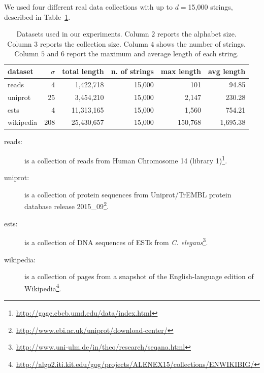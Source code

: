 \documentclass{elsarticle}
\begin{document}
We used four different real data collections with up to $d=$15,000 strings,
described in Table~\ref{t:data}.

\begin{savenotes}
\begin{table}[ht]
\centering
\caption{
Datasets used in our experiments. 
Column $2$ reports the alphabet size.
Column $3$ reports the collection size.
Column $4$ shows the number of strings.
Column $5$ and $6$ report the maximum and average length of each string.
}
\setlength{\tabcolsep}{4pt}
\renewcommand{\arraystretch}{1.2}
\label{t:data}
\begin{tabular}{lrrrrr}
\hline
dataset   & $\sigma$ & total length & n. of strings & max length & avg length  \\
\hline
{\sc reads}     & 4        & 1,422,718   & 15,000               & 101                     & 94.85    \\
{\sc uniprot}   & 25       & 3,454,210   & 15,000               & 2,147           & 230.28   \\
{\sc ests}      & 4        & 11,313,165  & 15,000       & 1,560           & 754.21   \\
{\sc wikipedia} & 208      & 25,430,657  & 15,000       & 150,768               & 1,695.38 \\
\hline
\end{tabular}

\begin{description}
\item[{\sc reads}:] is a collection of reads from Human Chromosome 14
  (library 1)\footnote{\url{http://gage.cbcb.umd.edu/data/index.html}}.

\item[{\sc uniprot}:] is a collection of protein sequences from
  Uniprot/TrEMBL protein database release
  2015\_09\footnote{\url{http://www.ebi.ac.uk/uniprot/download-center/}}.

\item[{\sc ests}:] is a collection of DNA sequences of ESTs from {\it
  C. elegans}\footnote{\url{http://www.uni-ulm.de/in/theo/research/seqana.html}}.

\item[{\sc wikipedia}:] is a collection of pages from a snapshot of the
  English-language edition of
  Wikipedia\footnote{\url{http://algo2.iti.kit.edu/gog/projects/ALENEX15/collections/ENWIKIBIG/}}.
\end{description}
\end{table}
\end{savenotes}
\end{document}
